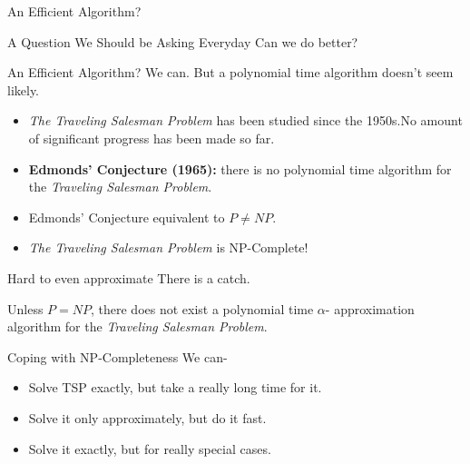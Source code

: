 \documentclass{beamer}
\begin{document}
\begin{frame}{An Efficient Algorithm?}
 \begin{block}{A Question We Should be Asking Everyday}
  \vspace{3mm} \centering Can we do better? \newline
    \end{block}
\end{frame}

\begin{frame}{An Efficient Algorithm?}
   We can. But a polynomial time algorithm doesn't seem likely.
    \begin{itemize}
     \item<2->  \textit{The Traveling Salesman Problem} has been studied since the 1950s.No amount of significant progress has been made so far.
    \item<3->  \textbf{Edmonds' Conjecture (1965):} there is no polynomial time algorithm for the \textit{Traveling Salesman Problem}. 
    \item<4-> Edmonds' Conjecture equivalent to \(P\neq NP\).
    \item<5-> \textit{The Traveling Salesman Problem} is \alert{NP-Complete}!
    \end{itemize} 
\end{frame}



\begin{frame}{Hard to even approximate}
There is a catch. \newline \newline
 \begin{theorem}
 Unless $P = NP$, there does not exist a polynomial time $\alpha$- approximation algorithm for the \textit{Traveling Salesman Problem}.
    \end{theorem}
\end{frame}

\begin{frame}{Coping with NP-Completeness}
We can-
    \begin{itemize}
    \item<0>  Solve TSP exactly, but take a really long time for it.
 \item<0> Solve it only approximately, but do it fast.
 \item<1-> Solve it exactly, but for really special cases.
    \end{itemize} 
\end{frame}
\end{document}
